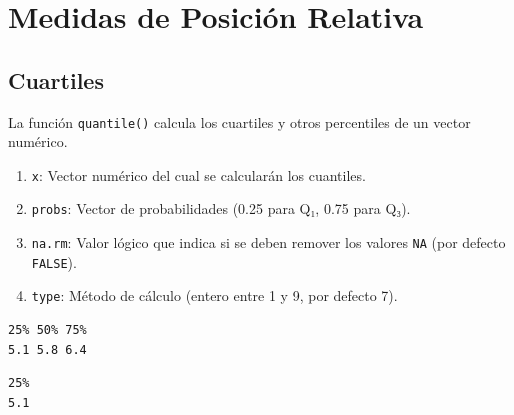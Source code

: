 \documentclass[
  spanish,
  letterpaper,
]{book}
\newenvironment{Shaded}{\begin{snugshade}}{\end{snugshade}}
\newcommand{\AttributeTok}[1]{\textcolor[rgb]{0.40,0.45,0.13}{#1}}
\newcommand{\CommentTok}[1]{\textcolor[rgb]{0.37,0.37,0.37}{#1}}
\newcommand{\FloatTok}[1]{\textcolor[rgb]{0.68,0.00,0.00}{#1}}
\newcommand{\FunctionTok}[1]{\textcolor[rgb]{0.28,0.35,0.67}{#1}}
\newcommand{\NormalTok}[1]{\textcolor[rgb]{0.00,0.23,0.31}{#1}}
\newcommand{\OtherTok}[1]{\textcolor[rgb]{0.00,0.23,0.31}{#1}}
\newcommand{\SpecialCharTok}[1]{\textcolor[rgb]{0.37,0.37,0.37}{#1}}
\begin{document}
\section{Medidas de Posición
Relativa}\label{medidas-de-posiciuxf3n-relativa-1}

\subsection{Cuartiles}\label{cuartiles-1}

La función \texttt{quantile()} calcula los cuartiles y otros percentiles
de un vector numérico.

\begin{enumerate}
\def\labelenumi{\arabic{enumi}.}
\item
  \texttt{x}: Vector numérico del cual se calcularán los cuantiles.
\item
  \texttt{probs}: Vector de probabilidades (0.25 para Q₁, 0.75 para Q₃).
\item
  \texttt{na.rm}: Valor lógico que indica si se deben remover los
  valores \texttt{NA} (por defecto \texttt{FALSE}).
\item
  \texttt{type}: Método de cálculo (entero entre 1 y 9, por defecto 7).
\end{enumerate}

\begin{Shaded}
\end{Shaded}

\begin{verbatim}
25% 50% 75% 
5.1 5.8 6.4 
\end{verbatim}

\begin{Shaded}
\end{Shaded}

\begin{verbatim}
25% 
5.1 
\end{verbatim}
\end{document}
